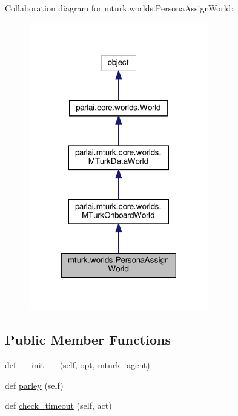 Collaboration diagram for mturk.\+worlds.\+Persona\+Assign\+World\+:
\nopagebreak
\begin{figure}[H]
\begin{center}
\leavevmode
\includegraphics[width=222pt]{classmturk_1_1worlds_1_1PersonaAssignWorld__coll__graph}
\end{center}
\end{figure}
\subsection*{Public Member Functions}
\begin{DoxyCompactItemize}
\item 
def \hyperlink{classmturk_1_1worlds_1_1PersonaAssignWorld_a88d153ec1fe746dd60d45a1bc925ce71}{\+\_\+\+\_\+init\+\_\+\+\_\+} (self, \hyperlink{classparlai_1_1core_1_1worlds_1_1World_a3640d92718acd3e6942a28c1ab3678bd}{opt}, \hyperlink{classparlai_1_1mturk_1_1core_1_1worlds_1_1MTurkOnboardWorld_a38d19c84f42e452f782df53df4fb9861}{mturk\+\_\+agent})
\item 
def \hyperlink{classmturk_1_1worlds_1_1PersonaAssignWorld_a591fad7aeb3d2938543a669b0ac0dc15}{parley} (self)
\item 
def \hyperlink{classmturk_1_1worlds_1_1PersonaAssignWorld_a5039d4c0de8884794bee9b2683d43055}{check\+\_\+timeout} (self, act)
\end{DoxyCompactItemize}
